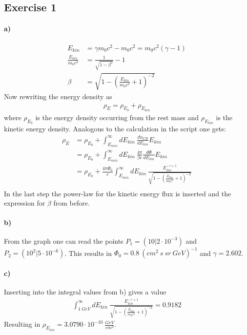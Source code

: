 \documentclass[10pt,a4paper]{article}
\begin{document}
\subsection*{Exercise 1}
\paragraph{a)}
\begin{align*}
E_{kin} &= \gamma m_0 c^2 - m_0 c^2 = m_0 c^2 (\gamma - 1) \\
\frac{E_{kin}}{m_0 c^2} &= \frac{1}{\sqrt{1-\beta^2}} - 1 \\
\beta &= \sqrt{1-\left(\frac{E_{kin}}{m_0 c^2} + 1\right)^{-2}}
\end{align*}
Now rewriting the energy density as
\begin{align*}
\rho_E = \rho_{E_0} + \rho_{E_{kin}}
\end{align*}
where $\rho_{E_0}$ is the energy density occurring from the rest mass and $\rho_{E_{kin}}$ is the kinetic energy density. Analogous to the calculation in the script one gets:
\begin{align*}
\rho_E &= \rho_{E_0} + \int_{E_{min}}^\infty dE_{kin}\ \frac{dn_{CR}}{dE_{kin}}E_{kin}\\
&=\rho_{E_0} + \int_{E_{min}}^\infty dE_{kin}\ \frac{4\pi}{\beta c}\frac{d\Phi}{dE_{kin}}E_{kin}\\
&=\rho_{E_0} + \frac{4\pi \Phi_0}{c} \int_{E_{min}}^\infty dE_{kin}\ \frac{E_{kin}^{-\gamma+1}}{\sqrt{1-\left(\frac{E_{kin}}{m_0 c^2} + 1\right)^{-2}}}\\
\end{align*}
In the last step the power-law for the kinetic energy flux is inserted and the expression for $\beta$ from before.

\paragraph{b)}
From the graph one can read the points $P_1 = (10 | 2\cdot 10^{-3})$ and $P_2=(10^2 | 5 \cdot 10^{-6})$. This results in $\Phi_0 = 0.8\ (cm^2\ s\ sr\ GeV)^{-1}$ and $\gamma = 2.602$.

\paragraph{c)}
Inserting into the integral values from b) gives a value
\begin{align*}
\int_{1\ GeV}^\infty dE_{kin}\ \frac{E_{kin}^{-\gamma+1}}{\sqrt{1-\left(\frac{E_{kin}}{m_0 c^2} + 1\right)^{-2}}} = 0.9182
\end{align*}
Resulting in $\rho_{E_{kin}} = 3.0790 \cdot 10^{-10}\ \frac{GeV}{cm^3}$.
\end{document}
